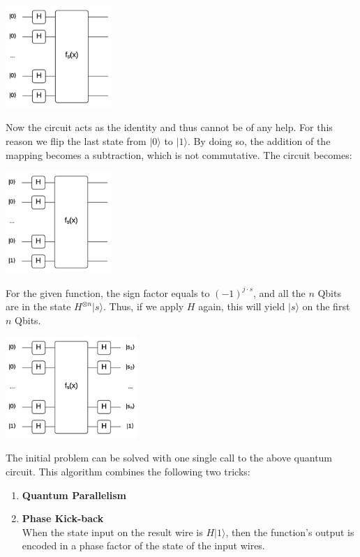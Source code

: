 \documentclass{article}
\begin{document}
\begin{center}
	\includegraphics[width=4cm]{assets/circuit3.png}
\end{center}
Now the circuit acts as the identity and thus cannot be of any help. For this reason we flip the last state from $|0\rangle$ to $|1\rangle$. By doing so, the addition of the mapping becomes a subtraction, which is not commutative. The circuit becomes:
\begin{center}
	\includegraphics[width=4cm]{assets/circuit4.png}
\end{center}
For the given function, the sign factor equals to $(-1)^{j\cdot s}$, and all the $n$ Qbits are in the state $H^{\otimes n}|s\rangle$. Thus, if we apply $H$ again, this will yield $|s\rangle$ on the first $n$ Qbits.
\begin{center}
	\includegraphics[width=5cm]{assets/circuit5.png}
\end{center}
The initial problem can be solved with one single call to the above quantum circuit. This algorithm combines the following two tricks:
\begin{enumerate}
	\item \textbf{Quantum Parallelism}
	\item \textbf{Phase Kick-back} \\
	When the state input on the result wire is $H|1\rangle$, then the function's output is encoded in a phase factor of the state of the input wires.
\end{enumerate}
	
\end{document}

